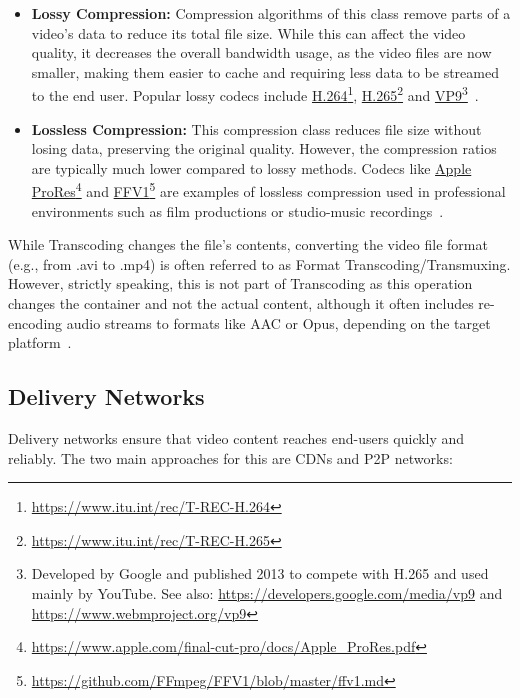 \begin{itemize}
    \item \textbf{Lossy Compression:} Compression algorithms of this class remove parts of a video's data to reduce its total file size. 
    While this can affect the video quality, it decreases the overall bandwidth usage, as the video files are now smaller, making them easier to cache and requiring less data to be streamed to the end user. Popular lossy codecs include \href{https://www.itu.int/rec/T-REC-H.264}{H.264}\footnote{\url{https://www.itu.int/rec/T-REC-H.264}}, \href{https://www.itu.int/rec/T-REC-H.265}{H.265}\footnote{\url{https://www.itu.int/rec/T-REC-H.265}} and \href{https://developers.google.com/media/vp9}{VP9}\footnote{Developed by Google and published 2013 to compete with H.265 and used mainly by YouTube. See also: \url{https://developers.google.com/media/vp9} and \url{https://www.webmproject.org/vp9}}~\parencite{combression}.
    \item \textbf{Lossless Compression:} This compression class reduces file size without losing data, preserving the original quality. However, the compression ratios are typically much lower compared to lossy methods. Codecs like \href{https://www.apple.com/final-cut-pro/docs/Apple_ProRes.pdf}{Apple ProRes}\footnote{\url{https://www.apple.com/final-cut-pro/docs/Apple_ProRes.pdf}} and \href{https://github.com/FFmpeg/FFV1/blob/master/ffv1.md}{FFV1}\footnote{\url{https://github.com/FFmpeg/FFV1/blob/master/ffv1.md}} are examples of lossless compression used in professional environments such as film productions or studio-music recordings~\parencite{combression}.
\end{itemize}

\noindent While Transcoding changes the file's contents, converting the video file format (e.g., from .avi to .mp4) is often referred to as Format Transcoding/Transmuxing. However, strictly speaking, this is not part of Transcoding as this operation changes the container and not the actual content, although it often includes re-encoding audio streams to formats like AAC or Opus, depending on the target platform~\parencite{transcoding}.

\subsection{Delivery Networks}
Delivery networks ensure that video content reaches end-users quickly and reliably. The two main approaches for this are \ac{CDN}s and \ac{P2P} networks:

